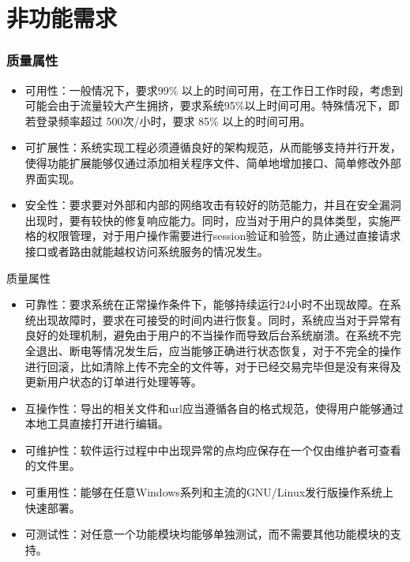 \section{非功能需求}
    \begin{frame}
        \frametitle{质量属性}
        \begin{itemize}
            \item 可用性：一般情况下，要求99\% 以上的时间可用，在工作日工作时段，考虑到可能会由于流量较大产生拥挤，要求系统95\%以上时间可用。特殊情况下，即若登录频率超过 500次/小时，要求 85\% 以上的时间可用。
            \item 可扩展性：系统实现工程必须遵循良好的架构规范，从而能够支持并行开发，使得功能扩展能够仅通过添加相关程序文件、简单地增加接口、简单修改外部界面实现。
            \item 安全性：要求要对外部和内部的网络攻击有较好的防范能力，并且在安全漏洞出现时，要有较快的修复响应能力。同时，应当对于用户的具体类型，实施严格的权限管理，对于用户操作需要进行session验证和验签，防止通过直接请求接口或者路由就能越权访问系统服务的情况发生。
        \end{itemize}
    \end{frame}

    \begin{frame}{质量属性}
        \begin{itemize}
            \item 可靠性：要求系统在正常操作条件下，能够持续运行24小时不出现故障。在系统出现故障时，要求在可接受的时间内进行恢复。同时，系统应当对于异常有良好的处理机制，避免由于用户的不当操作而导致后台系统崩溃。在系统不完全退出、断电等情况发生后，应当能够正确进行状态恢复，对于不完全的操作进行回滚，比如清除上传不完全的文件等，对于已经交易完毕但是没有来得及更新用户状态的订单进行处理等等。
            \item 互操作性：导出的相关文件和url应当遵循各自的格式规范，使得用户能够通过本地工具直接打开进行编辑。
            \item 可维护性：软件运行过程中中出现异常的点均应保存在一个仅由维护者可查看的文件里。
            \item 可重用性：能够在任意Windows系列和主流的GNU/Linux发行版操作系统上快速部署。
            \item 可测试性：对任意一个功能模块均能够单独测试，而不需要其他功能模块的支持。
        \end{itemize}
    \end{frame}
